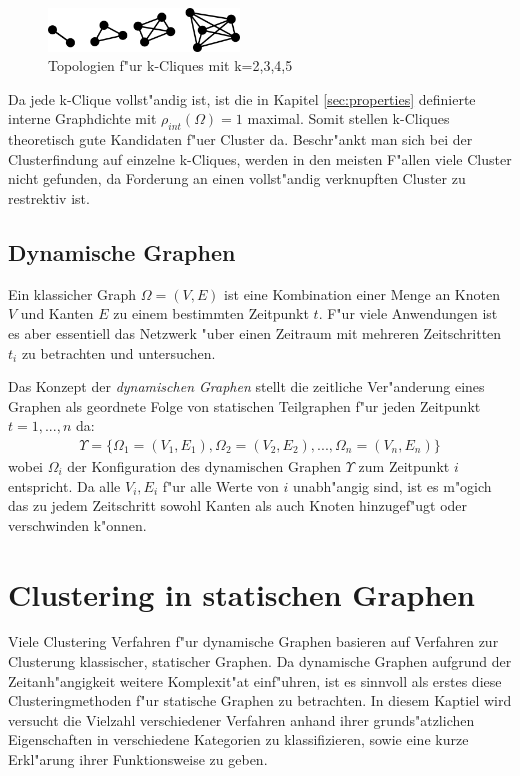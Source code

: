 \documentclass[journal]{vgtc}
\begin{document}
  	\begin{figure}[h]
  	 \centering
  	 \includegraphics[width=2in]{images/k-cliques-example}
  	 \caption{\label{fig:k_cliques} Topologien f"ur k-Cliques mit k=2,3,4,5}
  	\end{figure}

  	
  	Da jede k-Clique vollst"andig ist, ist die in Kapitel \ref{sec:properties} definierte
  	interne Graphdichte mit $\rho_{int}(\Omega)=1$ maximal. Somit stellen k-Cliques theoretisch gute 
  	Kandidaten f"uer Cluster da. Beschr"ankt man sich bei der Clusterfindung auf einzelne k-Cliques,
  	werden in den meisten F"allen viele Cluster nicht gefunden, da Forderung an einen vollst"andig
  	verknupften Cluster zu restrektiv ist.
    
  \subsection{Dynamische Graphen}
	Ein klassicher Graph $\Omega=(V,E)$ ist eine Kombination einer Menge an Knoten $V$ und
	Kanten $E$ zu einem bestimmten Zeitpunkt $t$. F"ur viele Anwendungen
	ist es aber essentiell das Netzwerk "uber einen Zeitraum mit mehreren Zeitschritten $t_i$ zu
	betrachten und untersuchen.
	
	Das Konzept der \emph{dynamischen Graphen}\cite{modularity} stellt die zeitliche Ver"anderung eines Graphen
	als geordnete Folge von statischen Teilgraphen f"ur jeden Zeitpunkt $t=1,...,n$ da:
	\begin{align}
		\Upsilon=\{\Omega_1=(V_1, E_1), \Omega_2=(V_2, E_2), ..., \Omega_n=(V_n,E_n)\}
	\end{align}
	wobei $\Omega_i$ der Konfiguration des dynamischen Graphen $\Upsilon$ zum Zeitpunkt $i$ entspricht.
	Da alle $V_i, E_i$ f"ur alle Werte von $i$ unabh"angig sind, ist es m"ogich das zu jedem Zeitschritt
	sowohl Kanten als auch Knoten hinzugef"ugt oder verschwinden k"onnen.
  
\section{Clustering in statischen Graphen}
  \label{sec:static_clustering}

  Viele Clustering Verfahren f"ur dynamische Graphen basieren auf Verfahren zur Clusterung klassischer,
  statischer Graphen. Da dynamische Graphen aufgrund der Zeitanh"angigkeit weitere Komplexit"at einf"uhren,
  ist es sinnvoll als erstes diese Clusteringmethoden f"ur statische Graphen zu betrachten.
  In diesem Kaptiel wird versucht die Vielzahl verschiedener Verfahren anhand ihrer grunds"atzlichen Eigenschaften
  in verschiedene Kategorien zu klassifizieren, sowie eine kurze Erkl"arung ihrer Funktionsweise zu geben.
  
\end{document}
